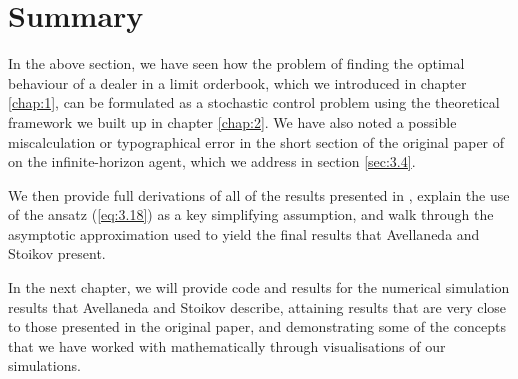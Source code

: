 \section{Summary}\label{sec:3.9}

In the above section, we have seen how the problem of finding the optimal behaviour
of a dealer in a limit orderbook, which we introduced in chapter \ref{chap:1}, can be
formulated as a stochastic control problem using the theoretical framework we built up
in chapter \ref{chap:2}. We have also noted a possible miscalculation or typographical
error in the short section of the original paper of \cite{AS2008} on the infinite-horizon
agent, which we address in section \ref{sec:3.4}. 

We then provide full derivations of all of the results presented in \cite{AS2008},
explain the use of the ansatz (\ref{eq:3.18}) as a key simplifying assumption, and walk
through the asymptotic approximation used to yield the final results that Avellaneda
and Stoikov present. 

In the next chapter, we will provide code and results for the
numerical simulation results that Avellaneda and Stoikov describe, attaining results 
that are very close to those presented in the original paper, and demonstrating some
of the concepts that we have worked with mathematically through visualisations of 
our simulations.